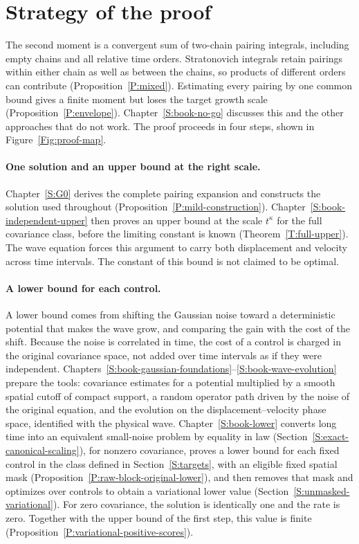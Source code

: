 \section{Strategy of the proof}\label{S:strategy}

The second moment is a convergent sum of two-chain pairing integrals,
including empty chains and all relative time orders. Stratonovich integrals
retain pairings within either chain as well as between the chains, so products
of different orders can contribute (Proposition~\ref{P:mixed}). Estimating
every pairing by one common bound gives a finite moment but loses the target
growth scale (Proposition~\ref{P:envelope}). Chapter~\ref{S:book-no-go}
discusses this and the other approaches that do not work. The proof proceeds in
four steps, shown in Figure~\ref{Fig:proof-map}.



\paragraph{One solution and an upper bound at the right scale.}
Chapter~\ref{S:G0} derives the complete pairing expansion and constructs the
solution used throughout (Proposition~\ref{P:mild-construction}).
Chapter~\ref{S:book-independent-upper} then proves an upper bound at the scale
$t^\kappa$ for the full covariance class, before the limiting constant is known
(Theorem~\ref{T:full-upper}). The wave equation forces this argument to carry
both displacement and velocity across time intervals. The constant of this
bound is not claimed to be optimal.

\paragraph{A lower bound for each control.}
A lower bound comes from shifting the Gaussian noise toward a deterministic
potential that makes the wave grow, and comparing the gain with the cost of the
shift. Because the noise is correlated in time, the cost of a control is
charged in the original covariance space, not added over time intervals as if
they were independent. Chapters~\ref{S:book-gaussian-foundations}--\ref{S:book-wave-evolution}
prepare the tools: covariance estimates for a potential multiplied by a smooth spatial cutoff of compact support, a
random operator path driven by the noise of the original equation, and the
evolution on the displacement--velocity phase space, identified with the
physical wave. Chapter~\ref{S:book-lower} converts long time into an
equivalent small-noise problem by equality in law
(Section~\ref{S:exact-canonical-scaling}), for nonzero covariance, proves a lower bound for each fixed control in the
class defined in Section~\ref{S:targets}, with an eligible fixed spatial mask
(Proposition~\ref{P:raw-block-original-lower}), and then removes that mask and
optimizes over controls to obtain a variational lower value
(Section~\ref{S:unmasked-variational}). For zero covariance, the solution is
identically one and the rate is zero. Together with the upper bound of the
first step, this value is finite (Proposition~\ref{P:variational-positive-scores}).

